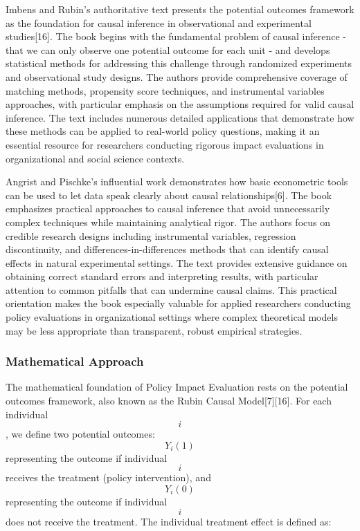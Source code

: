 \documentclass[main.tex]{subfiles}
\begin{document}

Imbens and Rubin's authoritative text presents the potential outcomes framework as the foundation for causal inference in observational and experimental studies[16]. The book begins with the fundamental problem of causal inference - that we can only observe one potential outcome for each unit - and develops statistical methods for addressing this challenge through randomized experiments and observational study designs. The authors provide comprehensive coverage of matching methods, propensity score techniques, and instrumental variables approaches, with particular emphasis on the assumptions required for valid causal inference. The text includes numerous detailed applications that demonstrate how these methods can be applied to real-world policy questions, making it an essential resource for researchers conducting rigorous impact evaluations in organizational and social science contexts.


Angrist and Pischke's influential work demonstrates how basic econometric tools can be used to let data speak clearly about causal relationships[6]. The book emphasizes practical approaches to causal inference that avoid unnecessarily complex techniques while maintaining analytical rigor. The authors focus on credible research designs including instrumental variables, regression discontinuity, and differences-in-differences methods that can identify causal effects in natural experimental settings. The text provides extensive guidance on obtaining correct standard errors and interpreting results, with particular attention to common pitfalls that can undermine causal claims. This practical orientation makes the book especially valuable for applied researchers conducting policy evaluations in organizational settings where complex theoretical models may be less appropriate than transparent, robust empirical strategies.

\subsubsection{Mathematical Approach}

The mathematical foundation of Policy Impact Evaluation rests on the potential outcomes framework, also known as the Rubin Causal Model[7][16]. For each individual $$i$$, we define two potential outcomes: $$Y_i(1)$$ representing the outcome if individual $$i$$ receives the treatment (policy intervention), and $$Y_i(0)$$ representing the outcome if individual $$i$$ does not receive the treatment. The individual treatment effect is defined as:
\end{document}
